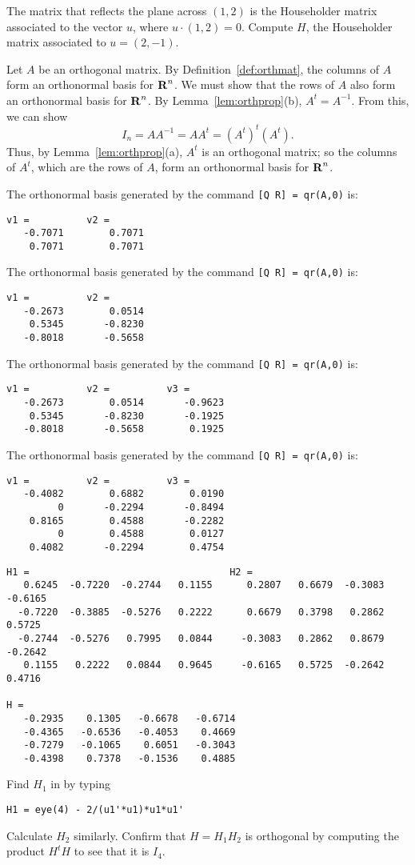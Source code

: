 \documentclass{ximera}
\begin{document}
\soln The matrix that reflects the plane across $(1,2)$ is the
Householder matrix associated to the vector $u$, where $u \cdot (1,2)
= 0$.  Compute $H$, the Householder matrix associated to $u = (2,-1)$.

Let $A$ be an orthogonal matrix.  By
Definition~\ref{def:orthmat}, the columns of $A$ form an orthonormal
basis for $\mbox{$\bf{R}$}^n$.  We must show that the rows of $A$ also form an
orthonormal basis for $\mbox{$\bf{R}$}^n$.  By Lemma~\ref{lem:orthprop}(b), $A^t =
A^{-1}$.  From this, we can show
\[
I_n = AA^{-1} = AA^t = (A^t)^t(A^t).
\]
Thus, by Lemma~\ref{lem:orthprop}(a), $A^t$ is an orthogonal matrix;
so the columns of $A^t$, which are the rows of $A$, form an orthonormal
basis for $\mbox{$\bf{R}$}^n$.

The orthonormal basis generated by the command {\tt [Q R] = qr(A,0)} is:
\begin{verbatim}
v1 =          v2 =
   -0.7071        0.7071
    0.7071        0.7071
\end{verbatim}

The orthonormal basis generated by the command {\tt [Q R] = qr(A,0)} is:

\begin{verbatim}
v1 =          v2 =
   -0.2673        0.0514
    0.5345       -0.8230
   -0.8018       -0.5658
\end{verbatim}

The orthonormal basis generated by the command {\tt [Q R] = qr(A,0)} is:
\begin{verbatim}
v1 =          v2 =          v3 = 
   -0.2673        0.0514       -0.9623
    0.5345       -0.8230       -0.1925
   -0.8018       -0.5658        0.1925
\end{verbatim}

The orthonormal basis generated by the command {\tt [Q R] = qr(A,0)} is:

\begin{verbatim}
v1 =          v2 =          v3 = 
   -0.4082        0.6882        0.0190
         0       -0.2294       -0.8494
    0.8165        0.4588       -0.2282
         0        0.4588        0.0127
    0.4082       -0.2294        0.4754
\end{verbatim}

\ans
\begin{verbatim}
H1 =                                   H2 =
   0.6245  -0.7220  -0.2744   0.1155      0.2807   0.6679  -0.3083  -0.6165
  -0.7220  -0.3885  -0.5276   0.2222      0.6679   0.3798   0.2862   0.5725
  -0.2744  -0.5276   0.7995   0.0844     -0.3083   0.2862   0.8679  -0.2642
   0.1155   0.2222   0.0844   0.9645     -0.6165   0.5725  -0.2642   0.4716

H =
   -0.2935    0.1305   -0.6678   -0.6714
   -0.4365   -0.6536   -0.4053    0.4669
   -0.7279   -0.1065    0.6051   -0.3043
   -0.4398    0.7378   -0.1536    0.4885
\end{verbatim}

\soln Find $H_1$ in \Matlab by typing
\begin{verbatim}
H1 = eye(4) - 2/(u1'*u1)*u1*u1'
\end{verbatim}

Calculate $H_2$ similarly.  Confirm that $H = H_1H_2$ is orthogonal by
computing the product $H^tH$ to see that it is $I_4$.
\end{document}
